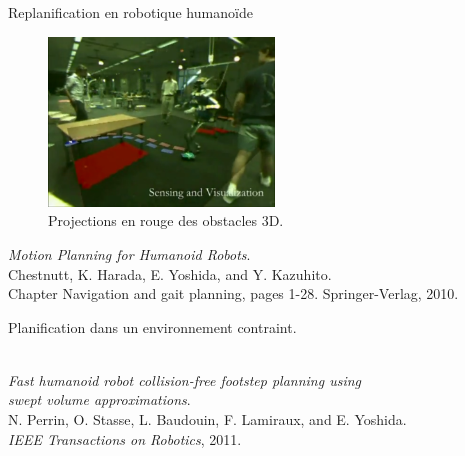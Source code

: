 \documentclass{beamer}
\begin{document}
\begin{frame}
 \center Replanification en robotique humanoïde
  \begin{figure}
    \includegraphics[width=6cm]{./images/Hrp2.png}\\
    Projections en rouge des obstacles 3D.
  \end{figure}

  \begin{small}
    \emph{Motion Planning for Humanoid Robots}.\\
    Chestnutt, K. Harada, E. Yoshida, and Y. Kazuhito.\\
    Chapter Navigation and gait planning, pages 1-28. Springer-Verlag, 2010.
  \end{small}

\end{frame}

\begin{frame}
  \begin{center}
    Planification dans un environnement contraint.\\
    \vspace{3mm}
    \\
  \end{center}

  \begin{center}
    \begin{small}
      \emph{Fast humanoid robot collision-free footstep planning using\\ swept volume approximations}.\\
      N. Perrin, O. Stasse, L. Baudouin, F. Lamiraux, and E. Yoshida.\\
      \textit{IEEE Transactions on Robotics}, 2011.
    \end{small}
  \end{center}
\end{frame}
\end{document}
